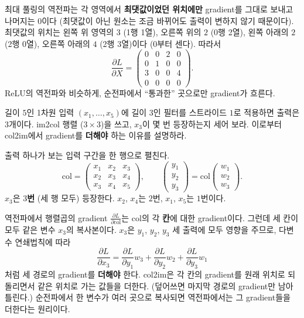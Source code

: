 \documentclass[11pt,a4paper]{article}
\newcommand{\pd}[2]{\frac{\partial #1}{\partial #2}}
\begin{document}
\begin{problems}
\begin{sol}
최대 풀링의 역전파는 각 영역에서 \textbf{최댓값이었던 위치에만} gradient를 그대로 보내고 나머지는 $0$이다
(최댓값이 아닌 원소는 조금 바뀌어도 출력이 변하지 않기 때문이다).
최댓값의 위치는 왼쪽 위 영역의 $3$ (1행 1열), 오른쪽 위의 $2$ (0행 2열), 왼쪽 아래의 $2$ (2행 0열), 오른쪽 아래의 $4$ (2행 3열)이다 (0부터 센다). 따라서
\[
\pd{L}{X}=\boxed{\begin{pmatrix}0&0&2&0\\0&1&0&0\\3&0&0&4\\0&0&0&0\end{pmatrix}}.
\]
ReLU의 역전파와 비슷하게, 순전파에서 ``통과한'' 곳으로만 gradient가 흐른다.
\end{sol}

\item 길이 $5$인 1차원 입력 $(x_1,\ldots,x_5)$에 길이 $3$인 필터를 스트라이드 $1$로 적용하면 출력은 $3$개이다.
im2col 행렬 ($3\times3$)을 쓰고, $x_3$이 몇 번 등장하는지 세어 보라.
이로부터 col2im에서 gradient를 \textbf{더해야} 하는 이유를 설명하라.

\begin{sol}
출력 하나가 보는 입력 구간을 한 행으로 펼친다.
\[
\text{col}=\begin{pmatrix}x_1&x_2&x_3\\x_2&x_3&x_4\\x_3&x_4&x_5\end{pmatrix},\qquad
\begin{pmatrix}y_1\\y_2\\y_3\end{pmatrix}=\text{col}\begin{pmatrix}w_1\\w_2\\w_3\end{pmatrix}.
\]
$x_3$은 \textbf{$3$번} (세 행 모두) 등장한다. $x_2$, $x_4$는 $2$번, $x_1$, $x_5$는 $1$번이다.

역전파에서 행렬곱의 gradient $\pd{L}{\text{col}}$는 col의 각 \textbf{칸}에 대한 gradient이다.
그런데 세 칸이 모두 같은 변수 $x_3$의 복사본이다. $x_3$은 $y_1$, $y_2$, $y_3$ 세 출력에 모두 영향을 주므로, 다변수 연쇄법칙에 따라
\[
\pd{L}{x_3}=\pd{L}{y_1}w_3+\pd{L}{y_2}w_2+\pd{L}{y_3}w_1
\]
처럼 세 경로의 gradient를 \textbf{더해야} 한다. col2im은 각 칸의 gradient를 원래 위치로 되돌리면서 같은 위치로 가는 값들을 더한다.
(덮어쓰면 마지막 경로의 gradient만 남아 틀린다.) 순전파에서 한 변수가 여러 곳으로 복사되면 역전파에서는 그 gradient들을 더한다는 원리이다.
\end{sol}


\end{problems}
\end{document}
